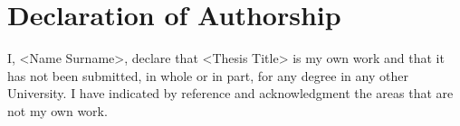\chapter*{Declaration of Authorship}


I, <Name Surname>, declare that <Thesis Title> is my own work and that it has not been submitted, in whole or in part, for
any degree in any other University. I have indicated by reference and acknowledgment
the areas that are not my own work.
 
 
